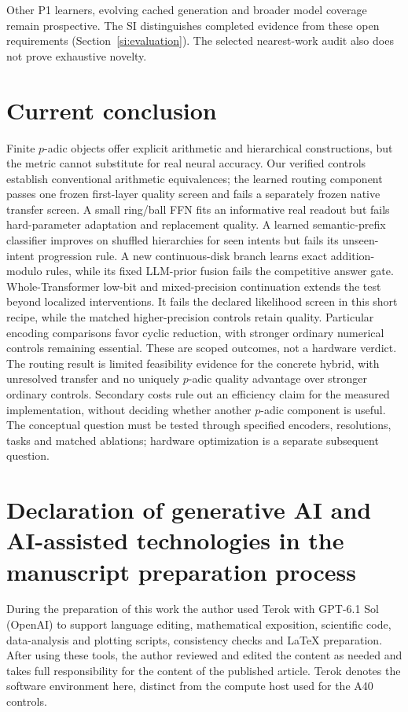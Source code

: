 \documentclass[11pt]{article}
\begin{document}
Other P1 learners, evolving cached generation and broader model coverage remain
prospective. The SI distinguishes completed evidence
from these open requirements (Section~\ref{si:evaluation}). The selected
nearest-work audit also does not prove exhaustive novelty.

\section{Current conclusion}

Finite \(p\)-adic objects offer explicit arithmetic and hierarchical
constructions, but the metric cannot substitute for real neural accuracy.
Our verified controls establish conventional arithmetic equivalences;
the learned routing component passes one frozen first-layer quality screen
and fails a separately frozen native transfer screen. A small ring/ball FFN
fits an informative real readout but fails hard-parameter adaptation and
replacement quality. A learned semantic-prefix classifier improves on shuffled
hierarchies for seen intents but fails its unseen-intent progression rule.
A new continuous-disk branch learns exact addition-modulo rules, while
its fixed LLM-prior fusion fails the competitive answer gate.
Whole-Transformer low-bit and mixed-precision continuation extends the test
beyond localized interventions. It fails the declared likelihood screen in
this short recipe, while the matched higher-precision controls retain
quality. Particular encoding comparisons favor cyclic reduction, with
stronger ordinary numerical controls remaining essential.
These are scoped outcomes, not a hardware verdict.
The routing result is limited
feasibility evidence for the concrete hybrid, with unresolved transfer and
no uniquely \(p\)-adic quality advantage over stronger ordinary controls.
Secondary costs rule out an efficiency claim for the measured implementation,
without deciding whether another \(p\)-adic component is useful. The conceptual
question must be tested through specified encoders, resolutions, tasks and
matched ablations; hardware optimization is a separate subsequent question.

\section*{Declaration of generative AI and AI-assisted technologies in the manuscript preparation process}

During the preparation of this work the author used Terok
\citep{vyskocil2026terok} with GPT-6.1 Sol (OpenAI) to support language editing,
mathematical exposition, scientific code, data-analysis and plotting scripts,
consistency checks and LaTeX preparation. After using these tools, the author
reviewed and edited the content as needed and takes full responsibility for
the content of the published article. Terok denotes the software environment
here, distinct from the compute host used for the A40 controls.
\end{document}
